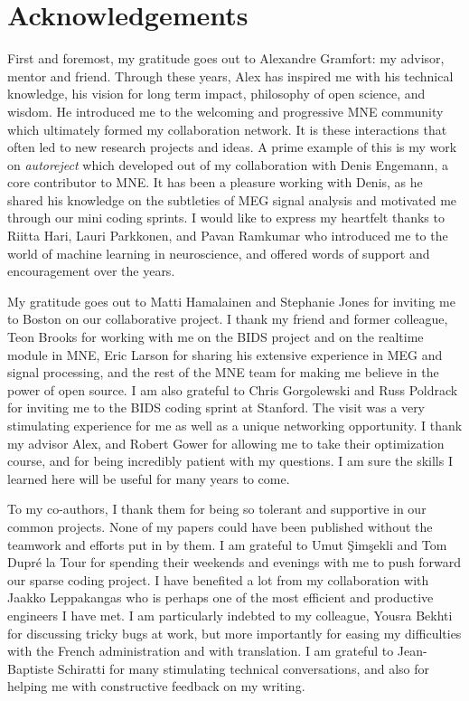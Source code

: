 \chapter*{Acknowledgements}
First and foremost, my gratitude goes out to Alexandre Gramfort: my advisor, mentor and friend. Through these years, Alex has inspired me with his technical knowledge, his vision for long term impact, philosophy of open science, and wisdom. He introduced me to the welcoming and progressive MNE community which ultimately formed my collaboration network. It is these interactions that often led to new research projects and ideas. A prime example of this is my work on \emph{autoreject} which developed out of my collaboration with Denis Engemann, a core contributor to MNE. It has been a pleasure working with Denis, as he shared his knowledge on the subtleties of MEG signal analysis and motivated me through our mini coding sprints. I would like to express my heartfelt thanks to Riitta Hari, Lauri Parkkonen, and Pavan Ramkumar who introduced me to the world of machine learning in neuroscience, and offered words of support and encouragement over the years. 

My gratitude goes out to Matti Hamalainen and Stephanie Jones for inviting me to Boston on our collaborative project. I thank my friend and former colleague, Teon Brooks for working with me on the BIDS project and on the realtime module in MNE, Eric Larson for sharing his extensive experience in MEG and signal processing, and the rest of the MNE team for making me believe in the power of open source. I am also grateful to Chris Gorgolewski and Russ Poldrack for inviting me to the BIDS coding sprint at Stanford. The visit was a very stimulating experience for me as well as a unique networking opportunity. I thank my advisor Alex, and Robert Gower for allowing me to take their optimization course, and for being incredibly patient with my questions. I am sure the skills I learned here will be useful for many years to come.

To my co-authors, I thank them for being so tolerant and supportive in our common projects. None of my papers could have been published without the teamwork and efforts put in by them. I am grateful to Umut \c{S}im\c{s}ekli and Tom Dupr\'{e} la Tour for spending their weekends and evenings with me to push forward our sparse coding project. I have benefited a lot from my collaboration with Jaakko Leppakangas who is perhaps one of the most efficient and productive engineers I have met. I am particularly indebted to my colleague, Yousra Bekhti for discussing tricky bugs at work, but more importantly for easing my difficulties with the French administration and with translation. I am grateful to Jean-Baptiste Schiratti for many stimulating technical conversations, and also for helping me with constructive feedback on my writing.


